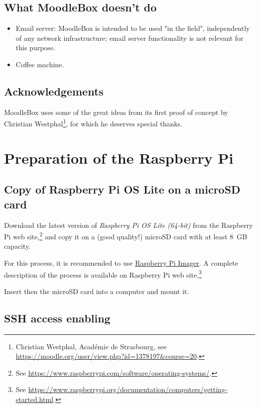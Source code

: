 \documentclass[12pt]{article}
\begin{document}
\subsection{What MoodleBox doesn't do}

\begin{itemize}
\item Email server: MoodleBox is intended to be used "in the field", independently of any network infrastructure; email server functionality is not relevant for this purpose.
\item Coffee machine.
\end{itemize}

\subsection{Acknowledgements}

MoodleBox uses some of the great ideas from its first proof of concept by Christian Westphal\footnote{Christian Westphal, Académie de Strasbourg, see \url{https://moodle.org/user/view.php?id=1378197&course=20}.}, for which he deserves special thanks.

\section{Preparation of the Raspberry Pi}

\subsection{Copy of Raspberry Pi OS Lite on a microSD card}

Download the latest version of \emph{Raspberry Pi OS Lite (64-bit)} from the Raspberry Pi web site,\footnote{See \url{https://www.raspberrypi.com/software/operating-systems/}.} and copy it on a (good quality!) microSD card with at least 8~GB capacity.

For this process, it is recommended to use \href{https://www.raspberrypi.com/software/}{Raspberry Pi Imager}.
A complete description of the process is available on Raspberry Pi web site.\footnote{See \url{https://www.raspberrypi.org/documentation/computers/getting-started.html}.}

Insert then the microSD card into a computer and mount it.

\subsection{SSH access enabling}
\end{document}
